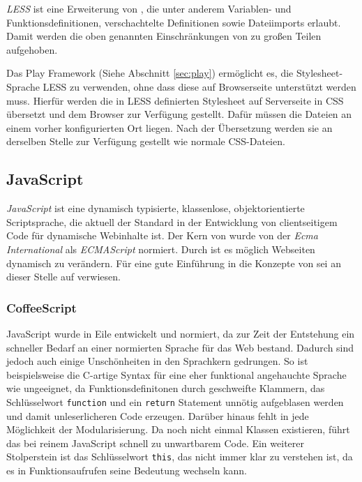 \textit{LESS} ist eine Erweiterung von , die unter anderem  Variablen- und
Funktionsdefinitionen, verschachtelte Definitionen sowie  Dateiimports erlaubt. Damit werden die
oben genannten Einschränkungen von  zu großen Teilen aufgehoben.

Das Play Framework (Siehe Abschnitt \ref{sec:play}) ermöglicht es, die Stylesheet-Sprache
LESS zu verwenden, ohne dass diese auf Browserseite unterstützt werden muss. Hierfür
werden die in  LESS definierten Stylesheet auf Serverseite in CSS übersetzt  und
dem Browser zur Verfügung gestellt. Dafür müssen die Dateien an einem vorher konfigurierten Ort
liegen. Nach der Übersetzung werden sie an derselben Stelle zur Verfügung gestellt wie normale
CSS-Dateien.

\subsection{JavaScript}

\textit{JavaScript} ist eine dynamisch typisierte, klassenlose, objektorientierte Scriptsprache, die
aktuell der Standard in der Entwicklung von clientseitigem Code für dynamische Webinhalte ist. Der
Kern von  wurde von der \textit{Ecma International} als \textit{ECMAScript} normiert. Durch
 ist es möglich Webseiten dynamisch zu verändern. Für eine gute Einführung in die Konzepte
von  sei an dieser Stelle auf \cite{js} verwiesen.

\subsubsection{CoffeeScript}
\label{sec:coffeescript}

JavaScript wurde in Eile entwickelt und normiert, da zur Zeit der Entstehung ein schneller Bedarf an
einer normierten Sprache für das Web bestand. Dadurch sind jedoch auch einige Unschönheiten in den
Sprachkern gedrungen. So ist beispielsweise die C-artige Syntax für eine eher funktional angehauchte
Sprache wie  ungeeignet, da Funktionsdefinitonen durch geschweifte Klammern, das
Schlüsselwort \texttt{function} und ein \texttt{return} Statement unnötig aufgeblasen werden und
damit unleserlicheren Code erzeugen. Darüber hinaus fehlt in  jede Möglichkeit der
Modularisierung. Da noch nicht einmal Klassen existieren, führt das bei reinem JavaScript schnell zu
unwartbarem Code. Ein weiterer Stolperstein ist das Schlüsselwort \texttt{this}, das nicht immer
klar zu verstehen ist, da es in Funktionsaufrufen seine Bedeutung wechseln kann.

